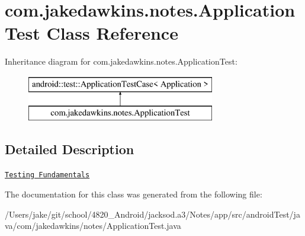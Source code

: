 \hypertarget{classcom_1_1jakedawkins_1_1notes_1_1_application_test}{}\section{com.\+jakedawkins.\+notes.\+Application\+Test Class Reference}
\label{classcom_1_1jakedawkins_1_1notes_1_1_application_test}
Inheritance diagram for com.\+jakedawkins.\+notes.\+Application\+Test\+:\begin{figure}[H]
\begin{center}
\leavevmode
\includegraphics[height=2.000000cm]{classcom_1_1jakedawkins_1_1notes_1_1_application_test}
\end{center}
\end{figure}


\subsection{Detailed Description}
\href{http://d.android.com/tools/testing/testing_android.html}{\tt Testing Fundamentals} 

The documentation for this class was generated from the following file\+:\begin{DoxyCompactItemize}
\item 
/\+Users/jake/git/school/4820\+\_\+\+Android/jacksod.\+a3/\+Notes/app/src/android\+Test/java/com/jakedawkins/notes/Application\+Test.\+java\end{DoxyCompactItemize}
